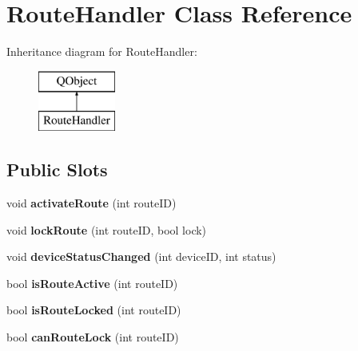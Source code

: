 \hypertarget{class_route_handler}{}\section{Route\+Handler Class Reference}
\label{class_route_handler}
Inheritance diagram for Route\+Handler\+:\begin{figure}[H]
\begin{center}
\leavevmode
\includegraphics[height=2.000000cm]{class_route_handler}
\end{center}
\end{figure}
\subsection*{Public Slots}
\begin{DoxyCompactItemize}
\item 
\mbox{\label{class_route_handler_a0e887e045860b5ae73a6f080e7fb483a}} 
void {\bfseries activate\+Route} (int route\+ID)
\item 
\mbox{\label{class_route_handler_a3414562e872fa261076663fb55f102d4}} 
void {\bfseries lock\+Route} (int route\+ID, bool lock)
\item 
\mbox{\label{class_route_handler_a56be26fab73e025b165cbe3c8a806ffb}} 
void {\bfseries device\+Status\+Changed} (int device\+ID, int status)
\item 
\mbox{\label{class_route_handler_a8ac449cce11b30b2d4d310af84b70828}} 
bool {\bfseries is\+Route\+Active} (int route\+ID)
\item 
\mbox{\label{class_route_handler_a7ebd0398bdc7dfcf3b5e865f3d1c28f5}} 
bool {\bfseries is\+Route\+Locked} (int route\+ID)
\item 
\mbox{\label{class_route_handler_a094b5f9fee8f5cfcd1a742e89d1d2b3d}} 
bool {\bfseries can\+Route\+Lock} (int route\+ID)
\end{DoxyCompactItemize}

